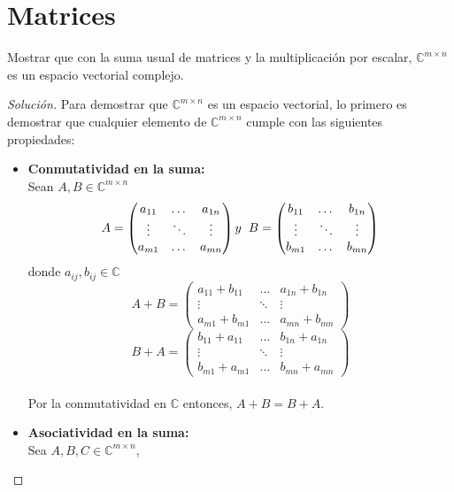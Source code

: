 \documentclass[12pt]{book}
\newcommand{\C}{\mathbb{C}}
\newenvironment{solucion}
  {\renewcommand\qedsymbol{$\square$}\begin{proof}[Solución]}
  {\end{proof}}
\begin{document}
\section{Matrices}
\eje Mostrar que con la suma usual de matrices y la multiplicación por escalar, $\C^{m\times n}$ es un espacio vectorial complejo.
\begin{solucion}
Para demostrar que $\C^{m\times n}$ es un espacio vectorial, lo primero es demostrar que cualquier elemento de $\C^{m\times n}$ cumple con las siguientes propiedades:\\
\begin{itemize}
    \item \textbf{Conmutatividad en la suma:}\\
        Sean $ A,B \in \C^{m\times n}$
        \[
        A=\begin{pmatrix}
        a_{11} & \dots & a_{1n}\\
        \vdots & \ddots & \vdots\\
        a_{m1} & \dots & a_{mn}
        \end{pmatrix}
        y \hspace{0.2cm}
        B=\begin{pmatrix}
        b_{11} & \dots & b_{1n}\\
        \vdots & \ddots & \vdots\\
        b_{m1} & \dots & b_{mn}
        \end{pmatrix}
        \]
        donde $a_{ij},b_{ij} \in \C$
        \[
        A + B =\begin{pmatrix}
        a_{11}+b_{11}  & \dots & a_{1n}+b_{1n}\\
        \vdots & \ddots & \vdots\\
        a_{m1}+b_{m1} & \dots & a_{mn}+b_{mn}
        \end{pmatrix}
        \]
        \[
        B + A =\begin{pmatrix}
        b_{11} + a_{11}  & \dots & b_{1n}+ a_{1n}\\
        \vdots & \ddots & \vdots\\
        b_{m1}+a_{m1} & \dots & b_{mn}+a_{mn}
        \end{pmatrix}
        \]\\
        Por la conmutatividad en $\C$ entonces, $A+B=B+A$. \\
    \item \textbf{Asociatividad en la suma:}\\
        Sea $A, B, C \in \C^{m\times n}$,\\

\end{itemize}
\end{solucion}
\end{document}

